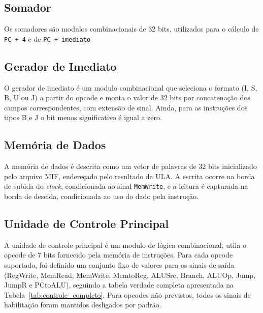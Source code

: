 \documentclass[conference]{IEEEtran}
\begin{document}
\subsection{Somador}
Os somadores são modulos combinacionais de 32 bits, utilizados para o cálculo de \texttt{PC + 4} e 
de \texttt{PC + imediato}

\subsection{Gerador de Imediato}
O gerador de imediato é um modulo combinacional que seleciona o formato (I, S, B, U ou J)
a partir do opcode e monta o valor de 32 bits por concatenação dos campos correspondentes, com extensão de
sinal. Ainda,  para as instruções dos tipos B e J o bit menos significativo é igual a zero.

\subsection{Memória de Dados}
A memória de dados é descrita como um vetor de palavras de 32 bits inicializado pelo arquivo MIF,
endereçado pelo resultado da ULA. A escrita ocorre na borda de subida do \textit{clock}, condicionada ao
sinal \texttt{MemWrite}, e a leitura é capturada na borda de descida, condicionada ao uso do
dado pela instrução.

\subsection{Unidade de Controle Principal}
A unidade de controle principal é um modulo de lógica combinacional, utila o opcode de 7 bits
fornecido pela memória de instruções.
Para cada opcode suportado, foi definido um conjunto fixo de valores para os sinais de saída (RegWrite,
MemRead, MemWrite, MemtoReg, ALUSrc, Branch, ALUOp, Jump, JumpR e PCtoALU), seguindo a tabela verdade
completa apresentada na Tabela~\ref{tab:controle_completo}. Para opcodes não previstos, todos os sinais de
habilitação foram mantidos desligados por padrão.
\end{document}
